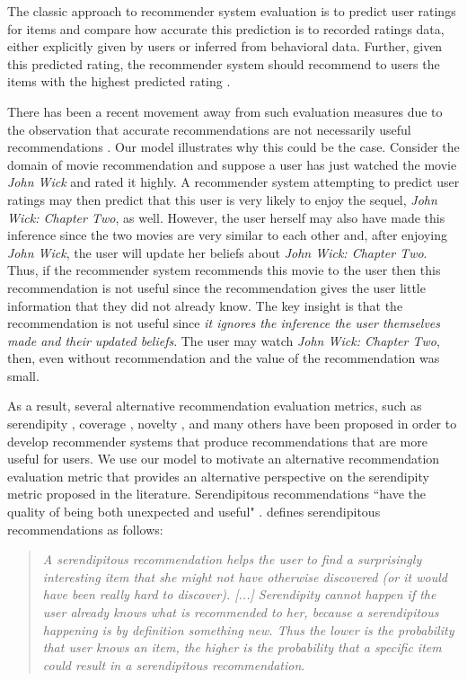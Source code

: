 \documentclass[sigconf, anonymous, review]{acmart}
\begin{document}
The classic approach to recommender system evaluation is to predict user ratings for items and compare how accurate this prediction is to recorded ratings data, either explicitly given by users or inferred from behavioral data. Further, given this predicted rating, the recommender system should recommend to users the items with the highest predicted rating \cite{adomavicius2005toward}.
\par


There has been a recent movement away from such evaluation measures due to the observation that accurate recommendations are not necessarily useful recommendations \cite{mcnee2006being}. Our model illustrates why this could be the case. Consider the domain of movie recommendation and suppose a user has just watched the movie \textit{John Wick} and rated it highly. A recommender system attempting to predict user ratings may then predict that this user is very likely to enjoy the sequel, \textit{John Wick: Chapter Two}, as well. However, the user herself may also have made this inference since the two movies are very similar to each other and, after enjoying \textit{John Wick}, the user will update her beliefs about \textit{John Wick: Chapter Two}. Thus, if the recommender system recommends this movie to the user then this recommendation is not useful since the recommendation gives the user little information that they did not already know. The key insight is that the recommendation is not useful since \textit{it ignores the inference the user themselves made and their updated beliefs}. The user may watch \textit{John Wick: Chapter Two}, then, even without recommendation and the value of the recommendation was small.
\par

As a result, several alternative recommendation evaluation metrics, such as serendipity \cite{kotkov2016survey}, coverage \cite{ge2010beyond}, novelty \cite{vargas2011rank}, and many others have been proposed in order to develop recommender systems that produce recommendations that are more useful for users. We use our model to motivate an alternative recommendation evaluation metric that provides an alternative perspective on the serendipity metric proposed in the literature. Serendipitous recommendations ``have the quality of being both unexpected and useful" \cite{maksai2015predicting}. \cite{iaquinta2010can} defines serendipitous recommendations as follows:
\begin{quote}
\textit{A serendipitous recommendation helps the
user to find a surprisingly interesting item that
she might not have otherwise discovered (or it
would have been really hard to discover). [...]
Serendipity cannot happen if the user already
knows what is recommended to her, because a
serendipitous happening is by definition something new. Thus the lower is the probability that user knows an item, the higher is the
probability that a specific item could result
in a serendipitous recommendation}.
\end{quote}
\end{document}
